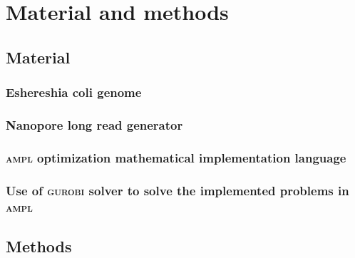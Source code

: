 \chapter{Material and methods}

\section{Material}

\subsection{Eshereshia coli genome}

\subsection{Nanopore long read generator}

\subsection{\textsc{ampl} optimization mathematical implementation language}

\subsection{Use of \textsc{gurobi} solver to solve the implemented problems in \textsc{ampl}}
% 


\section{Methods}

\subsection{}

\newpage